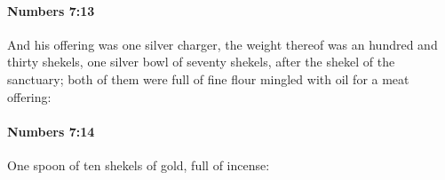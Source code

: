 		\paragraph{Numbers 7:13} %
			\label{NUMBERS-7-13}

			And his offering was one silver charger, the weight thereof was an hundred and thirty shekels, one silver bowl of seventy shekels, after the shekel of the sanctuary; both of them were full of fine flour mingled with oil for a meat offering:


		\paragraph{Numbers 7:14} %
			\label{NUMBERS-7-14}

			One spoon of ten shekels of gold, full of incense:


